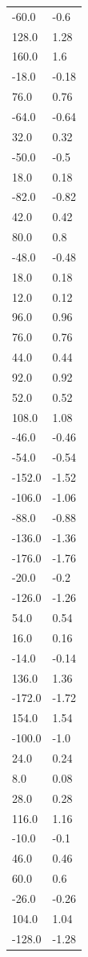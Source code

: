\begin{longtable}{ll}
-60.0 & -0.6 \\
128.0 & 1.28 \\
160.0 & 1.6 \\
-18.0 & -0.18 \\
76.0 & 0.76 \\
-64.0 & -0.64 \\
32.0 & 0.32 \\
-50.0 & -0.5 \\
18.0 & 0.18 \\
-82.0 & -0.82 \\
42.0 & 0.42 \\
80.0 & 0.8 \\
-48.0 & -0.48 \\
18.0 & 0.18 \\
12.0 & 0.12 \\
96.0 & 0.96 \\
76.0 & 0.76 \\
44.0 & 0.44 \\
92.0 & 0.92 \\
52.0 & 0.52 \\
108.0 & 1.08 \\
-46.0 & -0.46 \\
-54.0 & -0.54 \\
-152.0 & -1.52 \\
-106.0 & -1.06 \\
-88.0 & -0.88 \\
-136.0 & -1.36 \\
-176.0 & -1.76 \\
-20.0 & -0.2 \\
-126.0 & -1.26 \\
54.0 & 0.54 \\
16.0 & 0.16 \\
-14.0 & -0.14 \\
136.0 & 1.36 \\
-172.0 & -1.72 \\
154.0 & 1.54 \\
-100.0 & -1.0 \\
24.0 & 0.24 \\
8.0 & 0.08 \\
28.0 & 0.28 \\
116.0 & 1.16 \\
-10.0 & -0.1 \\
46.0 & 0.46 \\
60.0 & 0.6 \\
-26.0 & -0.26 \\
104.0 & 1.04 \\
-128.0 & -1.28 \\

\end{longtable}

